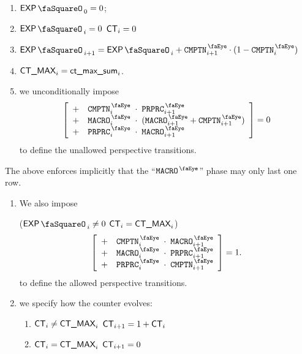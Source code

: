 \begin{enumerate}
	\item $\expStamp_{0} = 0$;
	\item \If $\expStamp_{i} = 0$ \Then $\textsf{CT}_{i} = 0$
	\item $\expStamp_{i + 1} = \expStamp_{i} + \isComputation_{i + 1} \cdot (1 - \isComputation_{i})$
	\item $\textsf{CT\_MAX}_{i} = \textsf{ct\_max\_sum}_{i}$.
	\item we unconditionally impose
	      \[
		      \left[ \begin{array}{lrcl}
				      + & \isComputation_{i}   & \!\!\! \cdot \!\!\! & \isPreprocessing_{i + 1}                      \\
				      + & \isMacro_{i}         & \!\!\! \cdot \!\!\! & (\isMacro_{i + 1} + \isComputation  _{i + 1}) \\
				      + & \isPreprocessing_{i} & \!\!\! \cdot \!\!\! & \isMacro        _{i + 1}                      \\
			      \end{array} \right]
		      = 0
	      \]
	      to define the unallowed perspective transitions.
\end{enumerate}
\saNote{} The above enforces implicitly that the ``$\isMacro$'' phase may only last one row.
\begin{enumerate}[resume]
	\item We also impose

	      \If \Big($\expStamp_{i} \neq 0$ \et $\textsf{CT}_{i} = \textsf{CT\_MAX}_{i}$\Big) \Then
	      \[
		      \left[ \begin{array}{lrcl}
				      + & \isComputation_{i}   & \!\!\! \cdot \!\!\! & \isMacro          _{i + 1} \\
				      + & \isMacro_{i}         & \!\!\! \cdot \!\!\! & \isPreprocessing  _{i + 1} \\
				      + & \isPreprocessing_{i} & \!\!\! \cdot \!\!\! & \isComputation    _{i + 1} \\
			      \end{array} \right]
		      = 1.
	      \]
	      to define the allowed perspective transitions.
	\item we specify how the counter evolves:
	      \begin{enumerate}
		      \item \If $\textsf{CT}_{i} \neq \textsf{CT\_MAX}_{i}$ \Then $\textsf{CT}_{i + 1} = 1 + \textsf{CT}_{i}$
		      \item \If $\textsf{CT}_{i} =    \textsf{CT\_MAX}_{i}$ \Then $\textsf{CT}_{i + 1} = 0$
	      \end{enumerate}
\end{enumerate}
